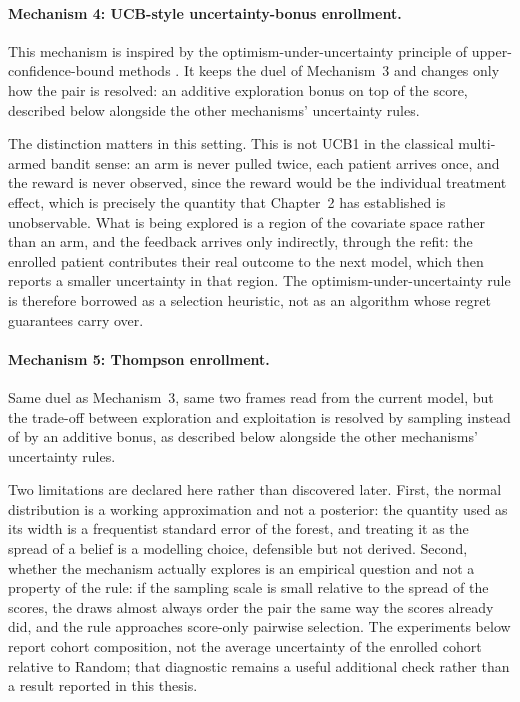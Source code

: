 \paragraph{Mechanism 4: UCB-style uncertainty-bonus enrollment.}

This mechanism is inspired by the optimism-under-uncertainty principle of
upper-confidence-bound methods \citep{auer2002}. It keeps the duel of Mechanism~3 and
changes only how the pair is resolved: an additive exploration bonus on top of the score,
described below alongside the other mechanisms' uncertainty rules.

\vspace{10pt}

The distinction matters in this setting. This is not UCB1 in the classical multi-armed
bandit sense: an arm is never pulled twice, each
patient arrives once, and the reward is never observed, since the reward would be the
individual treatment effect, which is precisely the quantity that Chapter~2 has
established is unobservable. What is being explored is a region of the covariate space
rather than an arm, and the feedback arrives only indirectly, through the refit: the
enrolled patient contributes their real outcome to the next model, which then reports a
smaller uncertainty in that region. The optimism-under-uncertainty rule is therefore
borrowed as a selection heuristic, not as an algorithm whose regret guarantees carry over.

\paragraph{Mechanism 5: Thompson enrollment.}
Same duel as Mechanism~3, same two frames read from the current model, but the
trade-off between exploration and exploitation is resolved by sampling instead of by an
additive bonus, as described below alongside the other mechanisms' uncertainty rules.

\vspace{10pt}

Two limitations are declared here rather than discovered later. First, the normal
distribution is a working approximation and not a posterior: the quantity used as its
width is a frequentist standard error of the forest, and treating it as the spread of a
belief is a modelling choice, defensible but not derived. Second, whether the mechanism
actually explores is an empirical question and not a property of the rule: if the
sampling scale is small relative to the spread of the scores, the draws almost always
order the pair the same way the scores already did, and the rule approaches score-only
pairwise selection. The experiments below report cohort composition, not the average uncertainty
of the enrolled cohort relative to Random; that diagnostic remains a useful additional
check rather than a result reported in this thesis.

